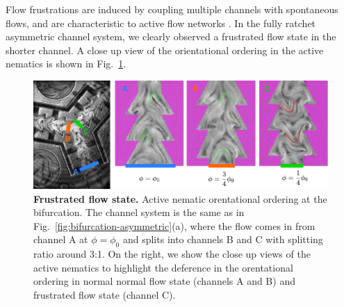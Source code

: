 \documentclass[%
10pt,
superscriptaddress,
twocolumn,
 amsmath,amssymb,
 aps,prx,
]{revtex4-2}
\begin{document}
Flow frustrations are induced by coupling multiple channels with spontaneous flows, and are characteristic to active flow networks \cite{Jorge2024, Beppu2024}.
In the fully ratchet asymmetric channel system, we clearly observed a frustrated flow state in the shorter channel.
A close up view of the orientational ordering in the active nematics is shown in Fig.~\ref{fig:frustrated-flow-state}.


\begin{figure}[htb]
    \includegraphics[width=.8\textwidth]{frustrated_flow_state}
    \caption{
    \textbf{Frustrated flow state.}
    Active nematic orentational ordering at the bifurcation. The channel system is the same as in Fig.~\ref{fig:bifurcation-asymmetric}(a), where the flow comes in from channel A at $\phi=\phi_0$ and splits into channels B and C with splitting ratio around 3:1. On the right, we show the close up views of the active nematics to highlight the deference in the orentational ordering in normal normal flow state (channels A and B) and frustrated flow state (channel C).
    }
    \label{fig:frustrated-flow-state}
\end{figure}




\end{document}
